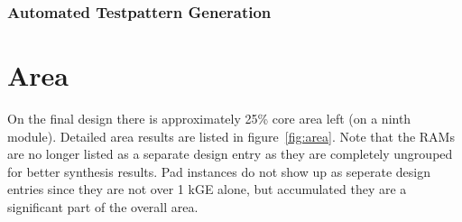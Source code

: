 \subsubsection{Automated Testpattern Generation}

\section{Area}

On the final design there is approximately 25\% core area left (on a ninth module). Detailed area results are listed in figure~\ref{fig:area}. Note that the RAMs are no longer listed as a separate design entry as they are completely ungrouped for better synthesis results. Pad instances do not show up as seperate design entries since they are not over 1 kGE alone, but accumulated they are a significant part of the overall area.

